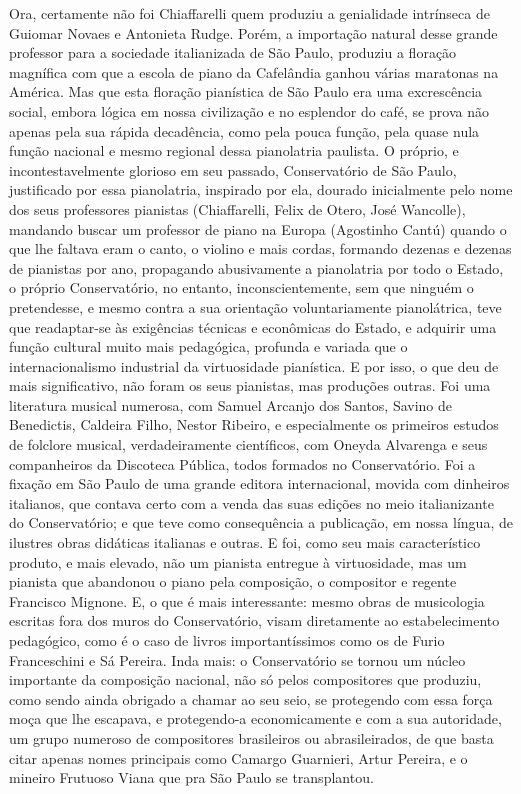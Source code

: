 Ora, certamente não foi Chiaffarelli quem produziu a genialidade
intrínseca de Guiomar Novaes e Antonieta Rudge. Porém, a importação
natural desse grande professor para a sociedade italianizada de São
Paulo, produziu a floração magnífica com que a escola de piano da
Cafelândia ganhou várias maratonas na América. Mas que esta floração
pianística de São Paulo era uma excrescência social, embora lógica em
nossa civilização e no esplendor do café, se prova não apenas pela sua
rápida decadência, como pela pouca função, pela quase nula função
nacional e mesmo regional dessa pianolatria paulista. O próprio, e
incontestavelmente glorioso em seu passado, Conservatório de São Paulo,
justificado por essa pianolatria, inspirado por ela, dourado
inicialmente pelo nome dos seus professores pianistas (Chiaffarelli,
Felix de Otero, José Wancolle), mandando buscar um professor de piano na
Europa (Agostinho Cantú) quando o que lhe faltava eram o canto, o
violino e mais cordas, formando dezenas e dezenas de pianistas por ano,
propagando abusivamente a pianolatria por todo o Estado, o próprio
Conservatório, no entanto, inconscientemente, sem que ninguém o
pretendesse, e mesmo contra a sua orientação voluntariamente
pianolátrica, teve que readaptar-se às exigências técnicas e econômicas
do Estado, e adquirir uma função cultural muito mais pedagógica,
profunda e variada que o internacionalismo industrial da virtuosidade
pianística. E por isso, o que deu de mais significativo, não foram os
seus pianistas, mas produções outras. Foi uma literatura musical
numerosa, com Samuel Arcanjo dos Santos, Savino de Benedictis, Caldeira
Filho, Nestor Ribeiro, e especialmente os primeiros estudos de folclore
musical, verdadeiramente científicos, com Oneyda Alvarenga e seus
companheiros da Discoteca Pública, todos formados no Conservatório. Foi
a fixação em São Paulo de uma grande editora internacional, movida com
dinheiros italianos, que contava certo com a venda das suas edições no
meio italianizante do Conservatório; e que teve como consequência a
publicação, em nossa língua, de ilustres obras didáticas italianas e
outras. E foi, como seu mais característico produto, e mais elevado, não
um pianista entregue à virtuosidade, mas um pianista que abandonou o
piano pela composição, o compositor e regente Francisco Mignone. E, o
que é mais interessante: mesmo obras de musicologia escritas fora dos
muros do Conservatório, visam diretamente ao estabelecimento pedagógico,
como é o caso de livros importantíssimos como os de Furio Franceschini e
Sá Pereira. Inda mais: o Conservatório se tornou um núcleo importante da
composição nacional, não só pelos compositores que produziu, como sendo
ainda obrigado a chamar ao seu seio, se protegendo com essa força moça
que lhe escapava, e protegendo-a economicamente e com a sua autoridade,
um grupo numeroso de compositores brasileiros ou abrasileirados, de que
basta citar apenas nomes principais como Camargo Guarnieri, Artur
Pereira, e o mineiro Frutuoso Viana que pra São Paulo se transplantou.

